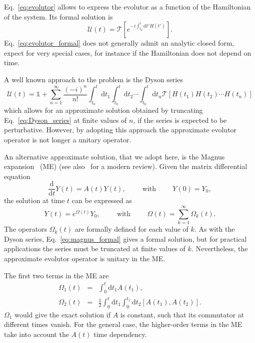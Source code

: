 \documentclass{article}
\newcommand{\de}[0]{\text{d}}
\begin{document}
Eq.~\ref{eq:evolutor} allows to express the evolutor as a function of the Hamiltonian of the system. Its formal solution is
\begin{equation}
	\mathcal{U}(t) = \mathcal{T} \left[ e^{-i \int_{t_0}^t \de t' H(t')} \right].\label{eq:evolutor_formal}
\end{equation}
Eq.~\ref{eq:evolutor_formal} does not generally admit an analytic closed form, expect for very special cases, for instance if the Hamiltonian does not depend on time.

A well known approach to the problem is the Dyson series 
\begin{equation}
	\mathcal{U}(t) = \mathbb{1} + \sum_{n=1}^\infty \frac{\left(-i\right)^n}{n!} \int_{t_0}^t \de t_1 \int_{t_0}^t \de t_2 \cdots \int_{t_0}^t \de t_n \mathcal{T} \left[H(t_1) H(t_2) \cdots H(t_n) \right] \label{eq:Dyson_series}
\end{equation}
which allows for an approximate solution obtained by truncating Eq.~\ref{eq:Dyson_series} at finite values of $n$, if the series is expected to be perturbative. However, by adopting this approach the approximate evolutor operator is not longer a unitary operator.

An alternative approximate solution, that we adopt here, is the Magnus expansion~\cite{magnus1954exponential} (ME) (see also~\cite{blanes2009magnus} for a modern review).
Given the matrix differential equation
\begin{equation}
	\frac{\de}{\de t} Y(t) = A(t) Y(t), \hspace{1cm} \text{with} \hspace{1cm} Y(0) = Y_0,
\end{equation}
the solution at time $t$ can be expressed as
\begin{equation}
	Y(t) = e^{\Omega(t)} Y_0, \hspace{1cm} \text{with} \hspace{1cm} \Omega(t) = \sum_{k=1}^\infty \Omega_k (t). \label{eq:magnus_formal}
\end{equation}
The operators $\Omega_k(t)$ are formally defined for each value of $k$. As with the Dyson series, Eq.~\ref{eq:magnus_formal} gives a formal solution, but for practical applications the series must be truncated at finite values of $k$. Nevertheless, the approximate evolutor operator is unitary in the ME.

The first two terms in the ME are
\begin{eqnarray}
	\Omega_1(t) &=& \int_0^t \de t_1 A(t_1), \\
	\Omega_2 (t) &=& \frac{1}{2} \int_0^t \de t_1 \int_0^{t_1}  \de t_2 \left[ A(t_1), A (t_2) \right].
\end{eqnarray} 
$\Omega_1$ would give the exact solution if $A$ is constant, such that its commutator at different times vanish. For the general case, the higher-order terms in the ME take into account the $A(t)$ time dependency.
\end{document}
